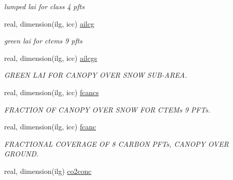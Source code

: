 \begin{DoxyCompactItemize}
\begin{DoxyCompactList}\small\item\em lumped lai for class\textquotesingle{} 4 pfts \end{DoxyCompactList}\item 
\hypertarget{structctem__statevars_1_1veg__gat_afe0769e6e60322e76f5dc61433188a6a}{}real, dimension(ilg, icc) \hyperlink{structctem__statevars_1_1veg__gat_afe0769e6e60322e76f5dc61433188a6a}{ailcg}\label{structctem__statevars_1_1veg__gat_afe0769e6e60322e76f5dc61433188a6a}

\begin{DoxyCompactList}\small\item\em green lai for ctem\textquotesingle{}s 9 pfts \end{DoxyCompactList}\item 
\hypertarget{structctem__statevars_1_1veg__gat_a349a6ca78d2dd8fce5cff615883c28a8}{}real, dimension(ilg, icc) \hyperlink{structctem__statevars_1_1veg__gat_a349a6ca78d2dd8fce5cff615883c28a8}{ailcgs}\label{structctem__statevars_1_1veg__gat_a349a6ca78d2dd8fce5cff615883c28a8}

\begin{DoxyCompactList}\small\item\em G\+R\+E\+E\+N L\+A\+I F\+O\+R C\+A\+N\+O\+P\+Y O\+V\+E\+R S\+N\+O\+W S\+U\+B-\/\+A\+R\+E\+A. \end{DoxyCompactList}\item 
\hypertarget{structctem__statevars_1_1veg__gat_a0e1508680e6393858556f6a4a9b1b604}{}real, dimension(ilg, icc) \hyperlink{structctem__statevars_1_1veg__gat_a0e1508680e6393858556f6a4a9b1b604}{fcancs}\label{structctem__statevars_1_1veg__gat_a0e1508680e6393858556f6a4a9b1b604}

\begin{DoxyCompactList}\small\item\em F\+R\+A\+C\+T\+I\+O\+N O\+F C\+A\+N\+O\+P\+Y O\+V\+E\+R S\+N\+O\+W F\+O\+R C\+T\+E\+M\textquotesingle{}s 9 P\+F\+Ts. \end{DoxyCompactList}\item 
\hypertarget{structctem__statevars_1_1veg__gat_a0c0fc266409ef3943adfd8399d987888}{}real, dimension(ilg, icc) \hyperlink{structctem__statevars_1_1veg__gat_a0c0fc266409ef3943adfd8399d987888}{fcanc}\label{structctem__statevars_1_1veg__gat_a0c0fc266409ef3943adfd8399d987888}

\begin{DoxyCompactList}\small\item\em F\+R\+A\+C\+T\+I\+O\+N\+A\+L C\+O\+V\+E\+R\+A\+G\+E O\+F 8 C\+A\+R\+B\+O\+N P\+F\+Ts, C\+A\+N\+O\+P\+Y O\+V\+E\+R G\+R\+O\+U\+N\+D. \end{DoxyCompactList}\item 
\hypertarget{structctem__statevars_1_1veg__gat_a4e12fa717814ec33d2501affbd79df03}{}real, dimension(ilg) \hyperlink{structctem__statevars_1_1veg__gat_a4e12fa717814ec33d2501affbd79df03}{co2conc}\label{structctem__statevars_1_1veg__gat_a4e12fa717814ec33d2501affbd79df03}


\end{DoxyCompactItemize}
